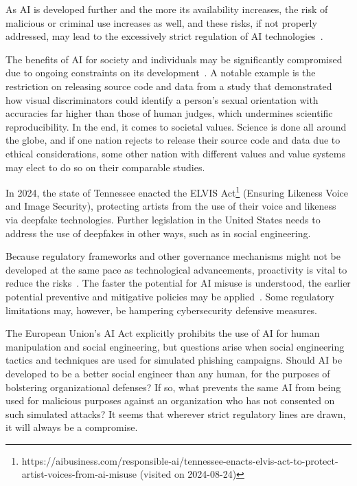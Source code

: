 As AI is developed further and the more its availability increases, the risk of malicious or criminal use increases as well, and these risks, if not properly addressed, may lead to the excessively strict regulation of AI technologies~\citep{king_AI_Crime_Interdisciplinary_Analysis_2019}.

The benefits of AI for society and individuals may be significantly compromised due to ongoing constraints on its development~\citep{king_AI_Crime_Interdisciplinary_Analysis_2019}. A notable example is the restriction on releasing source code and data from a study that demonstrated how visual discriminators could identify a person's sexual orientation with accuracies far higher than those of human judges, which undermines scientific reproducibility. In the end, it comes to societal values. Science is done all around the globe, and if one nation rejects to release their source code and data due to ethical considerations, some other nation with different values and value systems may elect to do so on their comparable studies.

In 2024, the state of Tennessee enacted the ELVIS Act\footnote{https://aibusiness.com/responsible-ai/tennessee-enacts-elvis-act-to-protect-artist-voices-from-ai-misuse (visited on 2024-08-24)} (Ensuring Likeness Voice and Image Security), protecting artists from the use of their voice and likeness via deepfake technologies. Further legislation in the United States needs to address the use of deepfakes in other ways, such as in social engineering.

Because regulatory frameworks and other governance mechanisms might not be developed at the same pace as technological advancements, proactivity is vital to reduce the risks~\citep{blauth_AI_Crime_Overview_Malicious_Use_Abuse_2022}. The faster the potential for AI misuse is understood, the earlier potential preventive and mitigative policies may be applied~\citep{king_AI_Crime_Interdisciplinary_Analysis_2019}. Some regulatory limitations may, however, be hampering cybersecurity defensive measures.

The European Union’s AI Act explicitly prohibits the use of AI for human manipulation and social engineering, but questions arise when social engineering tactics and techniques are used for simulated phishing campaigns. Should AI be developed to be a better social engineer than any human, for the purposes of bolstering organizational defenses? If so, what prevents the same AI from being used for malicious purposes against an organization who has not consented on such simulated attacks? It seems that wherever strict regulatory lines are drawn, it will always be a compromise.
